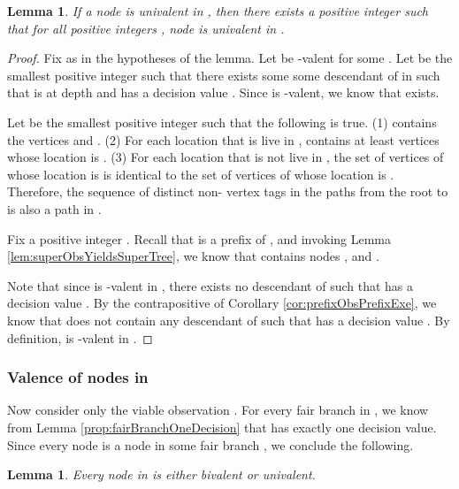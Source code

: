 \documentclass[11pt]{article}
\numberwithin{theorem}{section}
\newtheorem{lemma}[theorem]{Lemma}
\begin{document}
\begin{lemma}\label{lem:univalentNodeFiniteTimeInAllGs}
If a node  is univalent in , then there exists a positive integer  such that for all positive integers , node  is univalent in .
\end{lemma}
\begin{proof}
Fix  as in the hypotheses of the lemma. Let  be -valent for some .
Let  be the smallest positive integer such that there exists some some descendant  of  in  such that  is at depth  and  has a decision value . Since  is -valent, we know that  exists. 

Let  be the smallest positive integer such that the following is true. (1)  contains the vertices  and . (2) For each location  that is live in ,  contains at least  vertices whose location is . (3) For each location  that is not live in , the set of vertices of  whose location is  is identical to the set of vertices of  whose location is . Therefore, the sequence of distinct non- vertex tags in the paths from the root to  is also a path in .

Fix a positive integer . Recall that  is a prefix of , and invoking Lemma \ref{lem:superObsYieldsSuperTree}, we know that  contains nodes , and .


Note that since  is -valent in , there exists no descendant  of  such that  has a decision value . By the contrapositive of  Corollary \ref{cor:prefixObsPrefixExe}, we know that  does not contain any descendant  of  such that  has a decision value . By definition,  is -valent in .
\end{proof}

\subsubsection{Valence of nodes in }

Now consider only the viable observation . For every fair branch  in , we know from Lemma
\ref{prop:fairBranchOneDecision} that  has exactly one
decision value. Since every node  is a node in some fair branch
, we conclude the following.

\begin{lemma}\label{prop:everyNodeIsBiOrUnivalent}
 Every node  in  is either bivalent or univalent.
\end{lemma}
\end{document}
